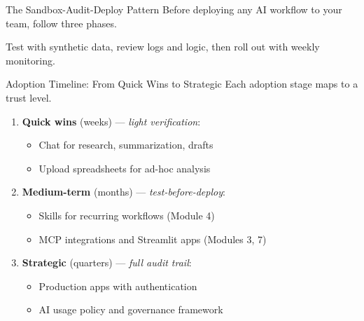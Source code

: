 \documentclass[aspectratio=169]{beamer}
\begin{document}
\begin{frame}{The Sandbox-Audit-Deploy Pattern}
Before deploying any AI workflow to your team, follow three phases.
\vspace{0.3cm}
\begin{center}
\end{center}
\vspace{0.3cm}
Test with synthetic data, review logs and logic, then roll out with weekly monitoring.
\end{frame}

\begin{frame}{Adoption Timeline: From Quick Wins to Strategic}
Each adoption stage maps to a trust level.
\vspace{0.3cm}
\begin{enumerate}
  \item \textbf{Quick wins} (weeks) --- \textit{light verification}:
  \begin{itemize}\small
    \item Chat for research, summarization, drafts
    \item Upload spreadsheets for ad-hoc analysis
  \end{itemize}
  \item \textbf{Medium-term} (months) --- \textit{test-before-deploy}:
  \begin{itemize}\small
    \item Skills for recurring workflows (Module 4)
    \item MCP integrations and Streamlit apps (Modules 3, 7)
  \end{itemize}
  \item \textbf{Strategic} (quarters) --- \textit{full audit trail}:
  \begin{itemize}\small
    \item Production apps with authentication
    \item AI usage policy and governance framework
  \end{itemize}
\end{enumerate}
\end{frame}
\end{document}
